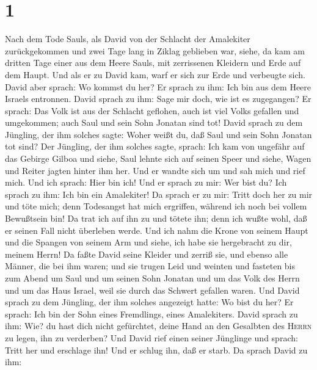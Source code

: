 \hypertarget{section}{%
\section{1}\label{section}}

 Nach dem Tode Sauls, als David von der Schlacht der
Amalekiter zurückgekommen und zwei Tage lang in Ziklag geblieben war,
 siehe, da kam am dritten Tage einer aus dem Heere Sauls,
mit zerrissenen Kleidern und Erde auf dem Haupt. Und als er zu David
kam, warf er sich zur Erde und verbeugte sich.  David aber
sprach: Wo kommst du her? Er sprach zu ihm: Ich bin aus dem Heere
Israels entronnen.  David sprach zu ihm: Sage mir doch,
wie ist es zugegangen? Er sprach: Das Volk ist aus der Schlacht
geflohen, auch ist viel Volks gefallen und umgekommen; auch Saul und
sein Sohn Jonatan sind tot!  David sprach zu dem Jüngling,
der ihm solches sagte: Woher weißt du, daß Saul und sein Sohn Jonatan
tot sind?  Der Jüngling, der ihm solches sagte, sprach:
Ich kam von ungefähr auf das Gebirge Gilboa und siehe, Saul lehnte sich
auf seinen Speer und siehe, Wagen und Reiter jagten hinter ihm her.
 Und er wandte sich um und sah mich und rief mich.
 Und ich sprach: Hier bin ich! Und er sprach zu mir: Wer
bist du? Ich sprach zu ihm: Ich bin ein Amalekiter!  Da
sprach er zu mir: Tritt doch her zu mir und töte mich; denn Todesangst
hat mich ergriffen, während ich noch bei vollem Bewußtsein bin!
 Da trat ich auf ihn zu und tötete ihn; denn ich wußte
wohl, daß er seinen Fall nicht überleben werde. Und ich nahm die Krone
von seinem Haupt und die Spangen von seinem Arm und siehe, ich habe sie
hergebracht zu dir, meinem Herrn!  Da faßte David seine
Kleider und zerriß sie, und ebenso alle Männer, die bei ihm waren;
 und sie trugen Leid und weinten und fasteten bis zum
Abend um Saul und um seinen Sohn Jonatan und um das Volk des Herrn und
um das Haus Israel, weil sie durch das Schwert gefallen waren.
 Und David sprach zu dem Jüngling, der ihm solches
angezeigt hatte: Wo bist du her? Er sprach: Ich bin der Sohn eines
Fremdlings, eines Amalekiters.  David sprach zu ihm: Wie?
du hast dich nicht gefürchtet, deine Hand an den Gesalbten des
\textsc{Herrn} zu legen, ihn zu verderben?  Und David
rief einen seiner Jünglinge und sprach: Tritt her und erschlage ihn! Und
er schlug ihn, daß er starb.  Da sprach David zu ihm:
